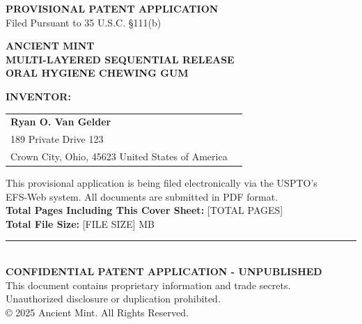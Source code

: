 \documentclass[12pt]{article}
\begin{document}
\nolinenumbers
\begin{titlepage}

\begin{center}

\large\textbf{PROVISIONAL PATENT APPLICATION}\\
\vspace{0.3cm}
\small{Filed Pursuant to 35 U.S.C. §111(b)}

\vspace{1cm}

\LARGE\textbf{ANCIENT MINT }\\
\vspace{0.3cm}
\Large\textbf{MULTI-LAYERED SEQUENTIAL RELEASE \\ ORAL HYGIENE CHEWING GUM}

\vspace{1cm}

\begin{minipage}{0.8\textwidth}
\centering
\large\textbf{INVENTOR:}\\
\vspace{0.5cm}
\begin{tabular}{p{}p{}}
\textbf{Ryan O. Van Gelder} \\
189 Private Drive 123 \\
Crown City, Ohio, 45623
United States of America
\end{tabular}
\end{minipage}

\vspace{1cm}

\small
This provisional application is being filed electronically via the USPTO's\\
EFS-Web system. All documents are submitted in PDF format.\\

\vspace{0.5cm}
\textbf{Total Pages Including This Cover Sheet:} [TOTAL PAGES]\\
\textbf{Total File Size:} [FILE SIZE] MB

\vfill

\rule{\textwidth}{0.5pt}\\
\small
\textbf{CONFIDENTIAL PATENT APPLICATION - UNPUBLISHED}\\
This document contains proprietary information and trade secrets.\\
Unauthorized disclosure or duplication prohibited.\\
© 2025 Ancient Mint. All Rights Reserved.

\end{center}

\end{titlepage}
\end{document}
